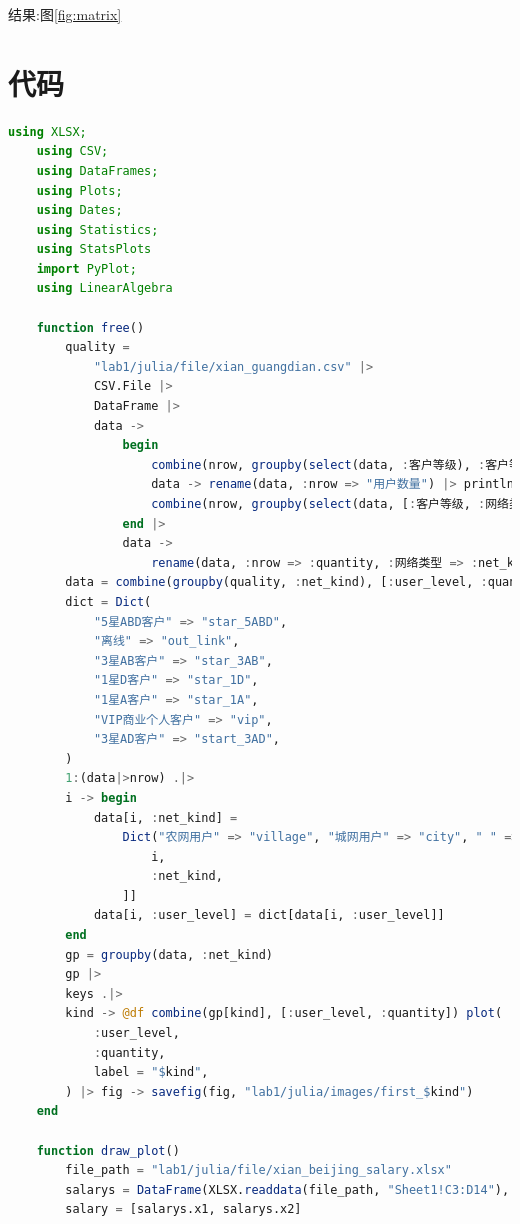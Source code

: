 \documentclass[a4paper]{article}
\makeatletter
\let\oldappendix\appendix %
\renewcommand\appendix{%
    \oldappendix
    \newcommand{\section@cntformat}{\appendixname~\thesection\quad}
}
\makeatother
\begin{document}
结果:图\ref{fig:matrix}

\newpage

\appendix
\section{代码}

\begin{lstlisting}[language=julia]
    using XLSX;
    using CSV;
    using DataFrames;
    using Plots;
    using Dates;
    using Statistics;
    using StatsPlots
    import PyPlot;
    using LinearAlgebra
    
    function free()
        quality =
            "lab1/julia/file/xian_guangdian.csv" |>
            CSV.File |>
            DataFrame |>
            data ->
                begin
                    combine(nrow, groupby(select(data, :客户等级), :客户等级)) |>
                    data -> rename(data, :nrow => "用户数量") |> println
                    combine(nrow, groupby(select(data, [:客户等级, :网络类型]), [:客户等级, :网络类型]))
                end |>
                data ->
                    rename(data, :nrow => :quantity, :网络类型 => :net_kind, :客户等级 => :user_level)
        data = combine(groupby(quality, :net_kind), [:user_level, :quantity])
        dict = Dict(
            "5星ABD客户" => "star_5ABD",
            "离线" => "out_link",
            "3星AB客户" => "star_3AB",
            "1星D客户" => "star_1D",
            "1星A客户" => "star_1A",
            "VIP商业个人客户" => "vip",
            "3星AD客户" => "start_3AD",
        )
        1:(data|>nrow) .|>
        i -> begin
            data[i, :net_kind] =
                Dict("农网用户" => "village", "城网用户" => "city", " " => "unknown")[data[
                    i,
                    :net_kind,
                ]]
            data[i, :user_level] = dict[data[i, :user_level]]
        end
        gp = groupby(data, :net_kind)
        gp |>
        keys .|>
        kind -> @df combine(gp[kind], [:user_level, :quantity]) plot(
            :user_level,
            :quantity,
            label = "$kind",
        ) |> fig -> savefig(fig, "lab1/julia/images/first_$kind")
    end
    
    function draw_plot()
        file_path = "lab1/julia/file/xian_beijing_salary.xlsx"
        salarys = DataFrame(XLSX.readdata(file_path, "Sheet1!C3:D14"), :auto) .|> identity
        salary = [salarys.x1, salarys.x2]
    

\end{lstlisting}
\end{document}
